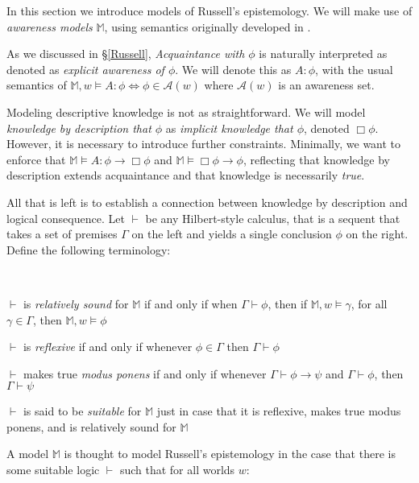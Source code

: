In this section we introduce models of Russell's epistemology.  We
will make use of \emph{awareness models} $\mathbb{M}$, using semantics originally developed in \cite{fagin_belief_1988}.

As we discussed in \S\ref{Russell}, \emph{Acquaintance with $\phi$} is
naturally interpreted as denoted as \emph{explicit awareness of
  $\phi$}.  We will denote this as $A:\phi$, with the usual
semantics of $\mathbb{M},w \models A:\phi \iff \phi \in \mathcal{A}(w)$
where $\mathcal{A}(w)$ is an awareness set.

Modeling descriptive knowledge is not as straightforward.  We will model
\emph{knowledge by description that $\phi$} as \emph{implicit knowledge
  that $\phi$}, denoted $\Box\phi$.  However, it is necessary to introduce
further constraints.
Minimally, we want to enforce that $\mathbb{M} \models A : \phi \to \Box \phi$ and
$\mathbb{M} \models \Box \phi \to \phi$, reflecting that knowledge by
description extends acquaintance and that knowledge is necessarily
\emph{true}.

All that is left is to establish a connection between knowledge by
description and logical
consequence.  Let $\vdash$ be any Hilbert-style calculus,
that is a sequent that takes a set of premises $\Gamma$ on the left and yields a
single conclusion $\phi$ on the right. Define the following terminology:
\begin{definition}\ 
\begin{itemizedot}
\item $\vdash$ is \emph{relatively sound} for $\mathbb{M}$ if and only if
  when $\Gamma \vdash \phi$, then if $\mathbb{M},w\models \gamma$, for
  all $\gamma \in \Gamma$, then
  $\mathbb{M},w \models \phi$
\item $\vdash$ is \emph{reflexive} if and only if whenever $\phi \in
  \Gamma$ then $\Gamma \vdash \phi$
\item $\vdash$ makes true \emph{modus ponens} if and only if whenever
  $\Gamma \vdash \phi \to \psi$ and $\Gamma \vdash \phi$, then $\Gamma
  \vdash \psi$
\item $\vdash$ is said to be \emph{suitable} for $\mathbb{M}$ just in
  case that it is reflexive, makes true modus ponens, and is
  relatively sound for $\mathbb{M}$
\end{itemizedot}
\end{definition}

A model $\mathbb{M}$ is thought to model Russell's epistemology in the
case that there is some suitable logic $\vdash$ such that for all
worlds $w$:

